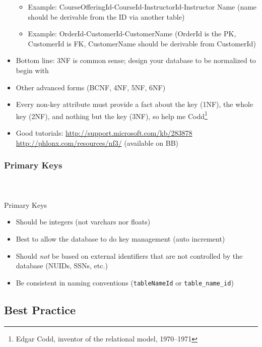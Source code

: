 \documentclass{beamer}
\begin{document}
\begin{frame}[allowframebreaks]
\begin{itemize}
\begin{itemize}
      \item Example: CourseOfferingId-CourseId-InstructorId-Instructor Name (name should be derivable from the ID via another table)
      \item Example: OrderId-CustomerId-CustomerName (OrderId is the PK, CustomerId is FK, CustomerName should be derivable from CustomerId)
    \end{itemize}
\framebreak
    \item Bottom line: 3NF is common sense; design your database to be normalized to begin with
    \item Other advanced forms (BCNF, 4NF, 5NF, 6NF)
    \item Every non-key attribute must provide a fact about the key (1NF), the whole key (2NF), and nothing but the key (3NF), so help me Codd\footnote{Edgar Codd, inventor of the relational model, 1970--1971}
    \item Good tutorials: \url{http://support.microsoft.com/kb/283878} \\
	\url{http://phlonx.com/resources/nf3/} (available on BB)
  \end{itemize}

\end{frame}

\begin{frame}
  \frametitle{Primary Keys}
  \framesubtitle{~}

  Primary Keys
  \begin{itemize}
    \item Should be integers (not varchars nor floats)
    \item Best to allow the database to do key management (auto increment)
    \item Should \emph{not} be based on external identifiers that are not controlled by the database (NUIDs, SSNs, etc.)
    \item Be consistent in naming conventions (\texttt{tableNameId} or \texttt{table_name_id})
  \end{itemize}

\end{frame}

\subsection{Best Practice}
\end{document}
